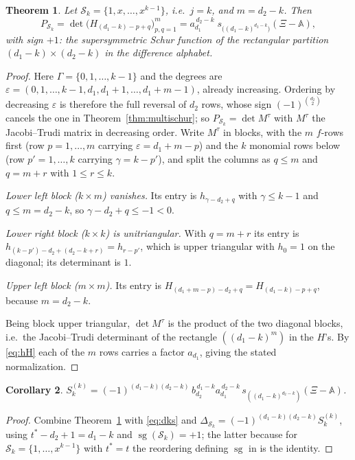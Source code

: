 \documentclass[11pt,reqno]{amsart}
\theoremstyle{plain}
\newtheorem{theorem}{Theorem}[section]
\newtheorem{corollary}[theorem]{Corollary}
\theoremstyle{definition}
\DeclareMathOperator{\sg}{sg}
\newcommand{\bA}{\mathbb{A}}
\newcommand{\bX}{\Xi}
\newcommand{\cS}{\mathcal{S}}
\begin{document}
\begin{theorem}\label{thm:rect}
Let $\cS_k=\{1,x,\dots,x^{k-1}\}$, i.e.\ $j=k$, and $m=d_2-k$. Then
\[
  P_{\cS_k}
  =\det\big(H_{(d_1-k)-p+q}\big)_{p,q=1}^{m}
  =a_{d_1}^{\,d_2-k}\;s_{\big((d_1-k)^{d_2-k}\big)}(\bX-\bA),
\]
with sign $+1$: the supersymmetric Schur function of the rectangular partition
$(d_1-k)\times(d_2-k)$ in the difference alphabet.
\end{theorem}

\begin{proof}
Here $\Gamma=\{0,1,\dots,k-1\}$ and the degrees are
$\varepsilon=(0,1,\dots,k-1,d_1,d_1+1,\dots,d_1+m-1)$, already increasing.
Ordering by decreasing $\varepsilon$ is therefore the full reversal of $d_2$ rows,
whose sign $(-1)^{\binom{d_2}{2}}$ cancels the one in
Theorem~\ref{thm:multischur}; so $P_{\cS_k}=\det M^\tau$ with $M^\tau$ the
Jacobi--Trudi matrix in decreasing order. Write $M^\tau$ in blocks, with the $m$
$f$-rows first (row $p=1,\dots,m$ carrying $\varepsilon=d_1+m-p$) and the $k$
monomial rows below (row $p'=1,\dots,k$ carrying $\gamma=k-p'$), and split the
columns as $q\le m$ and $q=m+r$ with $1\le r\le k$.

\emph{Lower left block ($k\times m$) vanishes.} Its entry is
$h_{\gamma-d_2+q}$ with $\gamma\le k-1$ and $q\le m=d_2-k$, so
$\gamma-d_2+q\le-1<0$.

\emph{Lower right block ($k\times k$) is unitriangular.} With $q=m+r$ its entry is
$h_{(k-p')-d_2+(d_2-k+r)}=h_{r-p'}$, which is upper triangular with $h_0=1$ on the
diagonal; its determinant is $1$.

\emph{Upper left block ($m\times m$).} Its entry is
$H_{(d_1+m-p)-d_2+q}=H_{(d_1-k)-p+q}$, because $m=d_2-k$.

Being block upper triangular, $\det M^\tau$ is the product of the two diagonal
blocks, i.e.\ the Jacobi--Trudi determinant of the rectangle $((d_1-k)^m)$ in the
$H$'s. By \eqref{eq:hH} each of the $m$ rows carries a factor $a_{d_1}$, giving
the stated normalization.
\end{proof}

\begin{corollary}\label{cor:LP}
$S_k^{(k)}=(-1)^{(d_1-k)(d_2-k)}\,b_{d_2}^{\,d_1-k}a_{d_1}^{\,d_2-k}\,
 s_{((d_1-k)^{d_2-k})}(\bX-\bA)$.
\end{corollary}

\begin{proof}
Combine Theorem~\ref{thm:rect} with \eqref{eq:dks} and
$\Delta_{\cS_k}=(-1)^{(d_1-k)(d_2-k)}S_k^{(k)}$, using $t^*-d_2+1=d_1-k$ and
$\sg(\cS_k)=+1$; the latter because for $\cS_k=\{1,\dots,x^{k-1}\}$ with $t^*=t$
the reordering defining $\sg$ in \cite[\S2]{DKS05} is the identity.
\end{proof}
\end{document}
